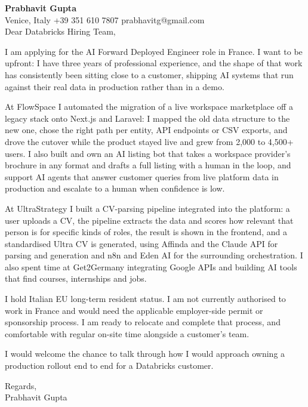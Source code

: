 \documentclass[a4paper,10.5pt]{article}
\begin{document}
\textbf{Prabhavit Gupta}\\
Venice, Italy \textbar{} +39 351 610 7807 \textbar{} prabhavitg@gmail.com\\[10pt]
Dear Databricks Hiring Team,

I am applying for the AI Forward Deployed Engineer role in France. I want to be upfront: I have three years of professional experience, and the shape of that work has consistently been sitting close to a customer, shipping AI systems that run against their real data in production rather than in a demo.

At FlowSpace I automated the migration of a live workspace marketplace off a legacy stack onto Next.js and Laravel: I mapped the old data structure to the new one, chose the right path per entity, API endpoints or CSV exports, and drove the cutover while the product stayed live and grew from 2,000 to 4,500+ users. I also built and own an AI listing bot that takes a workspace provider's brochure in any format and drafts a full listing with a human in the loop, and support AI agents that answer customer queries from live platform data in production and escalate to a human when confidence is low.

At UltraStrategy I built a CV-parsing pipeline integrated into the platform: a user uploads a CV, the pipeline extracts the data and scores how relevant that person is for specific kinds of roles, the result is shown in the frontend, and a standardised Ultra CV is generated, using Affinda and the Claude API for parsing and generation and n8n and Eden AI for the surrounding orchestration. I also spent time at Get2Germany integrating Google APIs and building AI tools that find courses, internships and jobs.

I hold Italian EU long-term resident status. I am not currently authorised to work in France and would need the applicable employer-side permit or sponsorship process. I am ready to relocate and complete that process, and comfortable with regular on-site time alongside a customer's team.

I would welcome the chance to talk through how I would approach owning a production rollout end to end for a Databricks customer.

Regards,\\
Prabhavit Gupta
\end{document}
